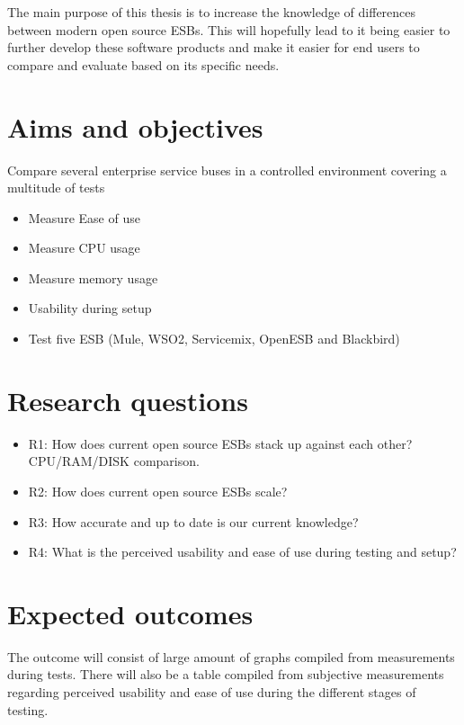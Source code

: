 \documentclass[10pt,a4paper]{proposal}
\begin{document}
The main purpose of this thesis is to increase the knowledge of differences between modern open source ESBs. 
This will hopefully lead to it being easier to further develop these software products and make it easier for end users to compare and evaluate based on its specific needs.


\section*{Aims and objectives}
Compare several enterprise service buses in a controlled environment covering a multitude of tests 

\begin{itemize}
	\item Measure Ease of use
	\item Measure CPU usage
	\item Measure memory usage
	\item Usability during setup
	\item  Test five ESB (Mule, WSO2, Servicemix, OpenESB and Blackbird)
\end{itemize}


\section*{Research questions}
\begin{itemize}
	\item R1: How does current open source ESBs stack up against each other? CPU/RAM/DISK comparison.
	\item R2: How does current open source ESBs scale?
	\item R3: How accurate and up to date is our current knowledge? 
	\item R4: What is the perceived usability and ease of use during testing and setup?
\end{itemize}


\section*{Expected outcomes}
The outcome will consist of large amount of graphs compiled from measurements during tests. 
There will also be a table compiled from subjective measurements regarding perceived usability and ease of use during the different stages of testing.
\end{document}
